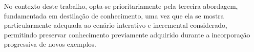 No contexto deste trabalho, opta-se prioritariamente pela terceira abordagem, fundamentada em destilação de conhecimento, uma vez que ela se mostra particularmente adequada ao cenário interativo e incremental considerado, permitindo preservar conhecimento previamente adquirido durante a incorporação progressiva de novos exemplos.





